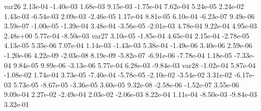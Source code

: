 var26  2.13e-04 -1.40e-03  1.68e-03  9.15e-03 -1.75e-04  7.62e-04  5.24e-05  2.24e-02  1.43e-03 -6.54e-03  2.09e-03 -2.46e-05  1.17e-04  8.81e-05  6.10e-04 -6.23e-07  9.49e-06  3.59e-07 -1.00e-05 -1.39e-04  3.48e-04 -3.56e-05 -2.01e-03  4.78e-04  9.22e-04  4.95e-03  2.48e+00  5.77e-04 -8.50e-03
var27  3.10e-05 -1.85e-04  4.65e-04  2.15e-04 -2.78e-05  4.13e-05  5.35e-06  7.07e-04  1.14e-03 -1.43e-03  5.38e-04 -1.49e-06  3.40e-06  2.59e-06 -1.20e-06  4.22e-09 -2.03e-08  8.19e-09 -5.82e-07 -6.91e-06 -7.78e-04  1.18e-05 -7.33e-04  9.84e-05  9.89e-06 -3.13e-06  5.77e-04  6.28e-03 -9.84e-03
var28 -1.02e-04  5.87e-04 -1.08e-02  1.74e-04  3.73e-05 -7.40e-04 -5.78e-05 -2.10e-02 -3.54e-02  3.31e-02 -6.17e-03  5.73e-05 -8.67e-05 -3.36e-05  3.60e-05  9.32e-08 -2.58e-06 -1.52e-07  3.55e-06  9.09e-04  2.27e-02 -2.49e-04  2.03e-02 -2.06e-03  8.22e-04  1.11e-04 -8.50e-03 -9.84e-03  3.32e-01
